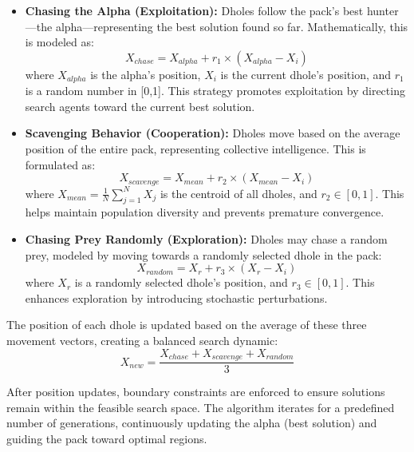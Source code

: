 \documentclass[12pt, a4paper]{article}
\begin{document}
\begin{itemize}
    \item \textbf{Chasing the Alpha (Exploitation):} Dholes follow the pack's best hunter—the alpha—representing the best solution found so far. Mathematically, this is modeled as:
    \begin{equation}
        X_{chase} = X_{alpha} + r_1 \times (X_{alpha} - X_i)
    \end{equation}
    where $X_{alpha}$ is the alpha's position, $X_i$ is the current dhole's position, and $r_1$ is a random number in [0,1]. This strategy promotes exploitation by directing search agents toward the current best solution.
    
    \item \textbf{Scavenging Behavior (Cooperation):} Dholes move based on the average position of the entire pack, representing collective intelligence. This is formulated as:
    \begin{equation}
        X_{scavenge} = X_{mean} + r_2 \times (X_{mean} - X_i)
    \end{equation}
    where $X_{mean} = \frac{1}{N}\sum_{j=1}^{N} X_j$ is the centroid of all dholes, and $r_2 \in [0,1]$. This helps maintain population diversity and prevents premature convergence.
    
    \item \textbf{Chasing Prey Randomly (Exploration):} Dholes may chase a random prey, modeled by moving towards a randomly selected dhole in the pack:
    \begin{equation}
        X_{random} = X_r + r_3 \times (X_r - X_i)
    \end{equation}
    where $X_r$ is a randomly selected dhole's position, and $r_3 \in [0,1]$. This enhances exploration by introducing stochastic perturbations.
\end{itemize}

The position of each dhole is updated based on the average of these three movement vectors, creating a balanced search dynamic:
\begin{equation}
    X_{new} = \frac{X_{chase} + X_{scavenge} + X_{random}}{3}
\end{equation}

After position updates, boundary constraints are enforced to ensure solutions remain within the feasible search space. The algorithm iterates for a predefined number of generations, continuously updating the alpha (best solution) and guiding the pack toward optimal regions.
\end{document}
